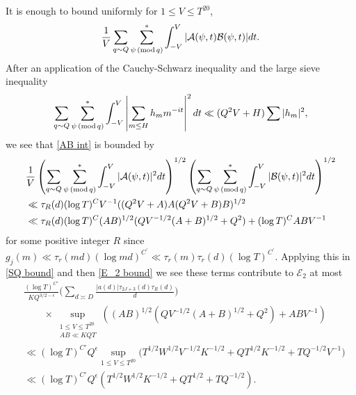 \documentclass[oneside, 12pt]{amsart}
\theoremstyle{definition}
\renewcommand{\pmod}[1]{\,(\textup{mod}\,#1)}
\newcommand{\leqs}{\leqslant }
\begin{document}
It is enough to bound uniformly for $1\leqs V\leqs T^{20}$, 
\begin{align}
\label{AB int}
\frac{1}{V}\sum_{q\sim Q}\sum_{\psi \pmod q}^*\int_{-V}^{V} |\mathcal{A}(\psi, t)\mathcal{B}(\psi, t)|dt.
\end{align}
After an application of the Cauchy-Schwarz inequality and the large sieve inequality
\begin{align*}
\sum_{q\sim Q}\sum_{\psi \pmod q}^* \int_{-V}^V \left|\sum_{m\leq H}h_mm^{-it}\right|^2dt\ll (Q^2V+H)\sum |h_m|^2,
\end{align*}
 we see that \eqref{AB int} is bounded by 
\begin{align*}
&\frac{1}{V}\left(\sum_{q\sim Q} \sum_{\psi \pmod q}^*\int_{-V}^V|\mathcal{A}(\psi, t)|^2dt\right)^{1/2}\left(\sum_{q\sim Q} \sum_{\psi \pmod q}^*\int_{-V}^V|\mathcal{B}(\psi, t)|^2dt\right)^{1/2}\\
&\ll \tau_R(d)(\log T)^CV^{-1}((Q^2V+A)A(Q^2V+B)B)^{1/2}\\
& \ll \tau_R(d)(\log T)^C(AB)^{1/2}(QV^{-1/2}(A+B)^{1/2}+Q^2)+(\log T)^CABV^{-1}
\end{align*}
for some positive integer $R$ since $g_j(m)\ll \tau_{r}(md)(\log md)^{C^\prime}\ll  \tau_{r}(m)\tau_{r}(d)(\log T)^{C^\prime} $.
Applying this in \eqref{SQ bound} and then \eqref{E_2 bound} we see these terms contribute to $\mathcal{E}_2$ at most
\begin{align}
& \frac{(\log T)^{C'}}{KQ^{3/2-\epsilon}}\Big(\sum_{d\asymp D}\frac{|a(d)|\tau_{2J+3}(d)\tau_R(d)}{d}\Big)\nonumber
\\
&\qquad\times\sup_{\substack{1\leqs V\leqs T^{20}\\ AB\ll KQT}}\left((AB)^{1/2}(QV^{-1/2}(A+B)^{1/2}+Q^2)+ABV^{-1}\right)\nonumber\\
&\ll (\log T)^{C'}Q^{\epsilon}\sup_{1\leqs V\leqs T^{20}} \Big(T^{1/2}W^{1/2}V^{-1/2}K^{-1/2}+Q T ^{1/2} K^{-1/2}+ TQ^{-1/2}V^{-1}\Big)\nonumber\\
& \ll (\log T)^{C'}Q^\epsilon\left( T^{1/2}W^{1/2}K^{-1/2}+QT^{1/2}+TQ^{-1/2}\right).\label{Type2Error}
\end{align}

\end{document}
